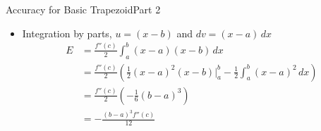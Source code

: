 \documentclass[10pt]{beamer}
\begin{document}
\begin{frame}{Accuracy for Basic Trapezoid}{Part 2}
\begin{itemize}
    \item Integration by parts, $u=(x-b)$ and $dv=(x-a)\,dx$
        \begin{align*}
          E &= \frac{f''(c)}{2}\int_a^b  (x-a)(x-b) \,dx \\
           &= \frac{f''(c)}{2}\left(\frac12(x-a)^2(x-b)\Bigg|_a^b-\frac12\int_a^b  (x-a)^2 \,dx\right) \\  
          &=\frac{f''(c)}{2}\left(-\frac{1}{6}(b-a)^3\right)\\ 
          &=-\frac{(b-a)^3 f''(c)}{12}
        \end{align*}
\end{itemize}
\end{frame}
\end{document}
